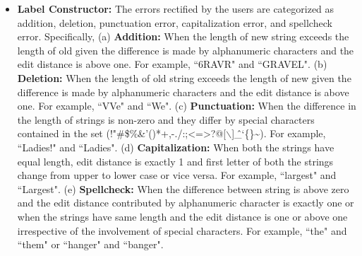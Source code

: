 \documentclass[10pt, conference, compsocconf]{IEEEtran}
\begin{document}
\begin{enumerate}
\begin{itemize}
\item \textbf{Label Constructor: }The errors rectified by the users are categorized as addition, deletion, punctuation error, capitalization error, and spellcheck error. 
Specifically,
(a) \textbf{Addition: } When the length of new string exceeds the length of old given the difference is made by alphanumeric characters and the edit distance is above one. For example, ``6RAVR" and ``GRAVEL".
(b) \textbf{Deletion: }When the length of old string exceeds the length of new given the difference is made by alphanumeric characters and the edit distance is above one. For example, ``VVe" and ``We".
(c) \textbf{Punctuation: }When the difference in the length of strings is non-zero and they differ by special characters contained in the set (!"\#\$\%\&'()*+,-./:;\textless=\textgreater?@[$\backslash$]\^\_`\{\textbar\}\textasciitilde). For example, ``Ladies!" and ``Ladies".
(d) \textbf{Capitalization: }When both the strings have equal length, edit distance is exactly 1 and first letter of both the strings change from upper to lower case or vice versa. For example, ``largest" and ``Largest".
(e) \textbf{Spellcheck: }When the difference between string is above zero and the edit distance contributed by alphanumeric character is exactly one or when the strings have same length and the edit distance is one or above one irrespective of the involvement of special characters. For example, ``the" and ``them" or ``hanger" and ``banger".



\end{itemize}
\end{enumerate}
\end{document}
